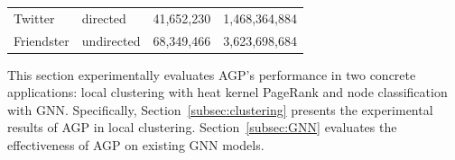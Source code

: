 \begin{table}[t]
\begin{small}
\begin{tabular}{|l|l|r|r|}
			Twitter  & directed & 41,652,230& 1,468,364,884 \\
			Friendster   & undirected & 68,349,466 & 3,623,698,684 \\
			\hline
		\end{tabular}
	\end{small}
	\label{tbl:datasets}
	\vspace{-5mm}
\end{table}

This section experimentally evaluates AGP's performance in two concrete applications: local clustering with heat kernel PageRank and node classification with GNN. Specifically, Section~\ref{subsec:clustering} presents the experimental results of AGP in local clustering. Section~\ref{subsec:GNN} evaluates the  effectiveness of AGP on existing GNN models. 




